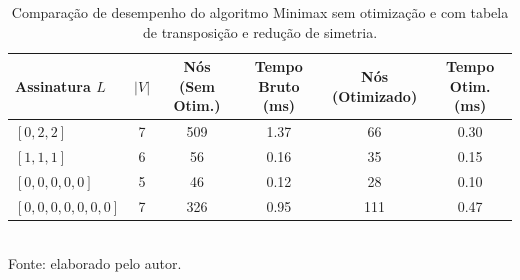 \begin{table}[htb]
\centering
\caption{Comparação de desempenho do algoritmo Minimax sem otimização e com tabela de transposição e redução de simetria.}
\label{tab:desempenho_minimax}
\begin{tabular}{lccccc}
\toprule
\textbf{Assinatura $L$} & $|V|$ & \textbf{Nós (Sem Otim.)} & \textbf{Tempo Bruto (ms)} & \textbf{Nós (Otimizado)} & \textbf{Tempo Otim. (ms)} \\
\midrule
$[0, 2, 2]$ & 7 & 509 & 1.37 & 66 & 0.30 \\
$[1, 1, 1]$ & 6 & 56 & 0.16 & 35 & 0.15 \\
$[0, 0, 0, 0, 0]$ & 5 & 46 & 0.12 & 28 & 0.10 \\
$[0, 0, 0, 0, 0, 0, 0]$ & 7 & 326 & 0.95 & 111 & 0.47 \\
\bottomrule
\end{tabular}
\\ \footnotesize{Fonte: elaborado pelo autor.}
\end{table}